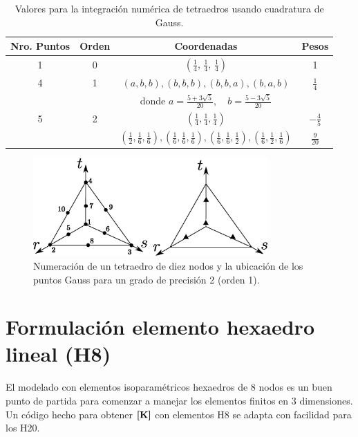 \newcommand{\one}[1]{\frac{1}{#1}}
\begin{table}[htb!]
    \centering
    \begin{tabular}{cccc}
        Nro. Puntos & Orden & Coordenadas & Pesos \\ \hline \hline
        1 & 0 & \( \left(\frac{1}{4}, \,\frac{1}{4}, \, \frac{1}{4} \right)\) & 1 \\ [1pt] \hline
        4 & 1 & \(  (a,b,b), (b,b,b), (b,b,a), (b,a,b) \) & \( \frac{1}{4}\) \\ [2pt]
          &   &donde    \( a = \frac{5+3\sqrt{5}}{20}, \quad b =\frac{5-3\sqrt{5}}{20} \) & \\[2pt] \hline 
        5 & 2 & \( \left(\frac{1}{4}, \frac{1}{4}, \frac{1}{4} \right)\) & \( -\frac{4}{5}\)   \\[5pt]
          &   &  \( \left(\one{2},\one{6}, \one{6} \right), \left(\one{6},\one{6}, \one{6} \right), \left(\one{6},\one{6}, \one{2} \right), \left(\one{6},\one{2}, \one{6} \right) \) & \(\frac{9}{20}\)
    \end{tabular}
    \caption{Valores para la integración numérica de tetraedros usando cuadratura de Gauss.}
\end{table}

\begin{figure}[htb!]
    \centering
    \includegraphics[width=0.8\textwidth]{fig/T10numbering.eps}
    \caption{Numeración de un tetraedro de diez nodos y la ubicación de los puntos Gauss para un grado de precisión 2 (orden 1).}
    \label{fig:T10numbering}
\end{figure}

\section{Formulación elemento hexaedro lineal (H8)}
El modelado con elementos isoparamétricos hexaedros de 8 nodos es un buen punto de partida para comenzar a manejar los elementos finitos en 3 dimensiones. Un código hecho para obtener $\boldsymbol{[}\mathbf{K} \boldsymbol{]}$ con elementos H8 se adapta con facilidad para los H20.

